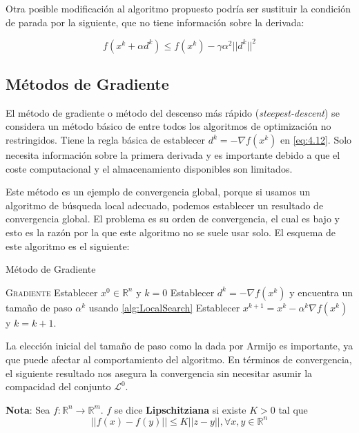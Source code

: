 Otra posible modificación al algoritmo propuesto podría ser sustituir la condición de parada por la siguiente, que no tiene información sobre la derivada:

\begin{equation}
f(x^k +\alpha d^k) \leq f(x^k)-\gamma\alpha^2||d^k||^2
\label{eq:4.16}
\end{equation}

\subsection{Métodos de Gradiente}

El método de gradiente o método del descenso más rápido (\textit{steepest-descent}) se considera un método básico de entre todos los algoritmos de optimización no restringidos. 
Tiene la regla básica de establecer $d^k = -\nabla f(x^k)$ en \ref{eq:4.12}. 
Solo necesita información sobre la primera derivada y es importante debido a que el coste computacional y el almacenamiento disponibles son limitados. 

Este método es un ejemplo de convergencia global, porque si usamos un algoritmo de búsqueda local adecuado, podemos establecer un resultado de convergencia global. 
El problema es su orden de convergencia, el cual es bajo y esto es la razón por la que este algoritmo no se suele usar solo. 
El esquema de este algoritmo es el siguiente:

\begin{algorithm}
\caption{Método de Gradiente}\label{alg:GradientMethod}
\begin{algorithmic}[1]
\Procedure \textsc{Gradiente}
\State Establecer $x^0\in\mathbb{R}^n$ y $k=0$
	\State Establecer $d^k=-\nabla f(x^k)$ y encuentra un tamaño de paso $\alpha^k$ usando \ref{alg:LocalSearch}
	\State Establecer $x^{k+1} = x^k - \alpha^k\nabla f(x^k)$ y $k=k+1$.
\EndWhile
\EndProcedure
\end{algorithmic}
\end{algorithm}

La elección inicial del tamaño de paso como la dada por Armijo es importante, ya que puede afectar al comportamiento del algoritmo. 
En términos de convergencia, el siguiente resultado nos asegura la convergencia sin necesitar asumir la compacidad del conjunto $\mathcal{L}^0$.

\textbf{Nota}: Sea $f:\mathbb{R}^n\xrightarrow{}{}\mathbb{R}^m$. $f$ se dice \textbf{Lipschitziana} si existe $K>0$ tal que
\begin{equation*}
||f(x)-f(y)|| \leq K||z-y||, \forall x,y\in\mathbb{R}^n
\end{equation*}

